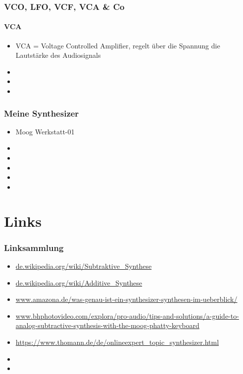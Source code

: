 \documentclass[11pt,ngerman]{beamer}
\begin{document}
\begin{frame}
\frametitle{VCO, LFO, VCF, VCA \& Co}
\framesubtitle{VCA}

\begin{itemize}
\item VCA = Voltage Controlled Amplifier, regelt über die Spannung die Lautstärke des Audiosignals
\item 
\item 
\item 
\end{itemize}
\end{frame}



\begin{frame}
\frametitle{Meine Synthesizer}


\begin{itemize}
\item Moog Werkstatt-01
\item 
\item 
\item 
\item 
\item 
\end{itemize}
\end{frame}

 
\section{Links} 
 
\begin{frame}[allowframebreaks]
\frametitle{Linksammlung}


\begin{itemize}
\item \url{de.wikipedia.org/wiki/Subtraktive_Synthese}
\item \url{de.wikipedia.org/wiki/Additive_Synthese}
\item \url{www.amazona.de/was-genau-ist-ein-synthesizer-synthesen-im-ueberblick/}
\item \url{www.bhphotovideo.com/explora/pro-audio/tips-and-solutions/a-guide-to-analog-subtractive-synthesis-with-the-moog-phatty-keyboard}
\item \url{https://www.thomann.de/de/onlineexpert_topic_synthesizer.html}
\item 
\item 
\end{itemize}
\end{frame} 
 
 
 
\end{document}
